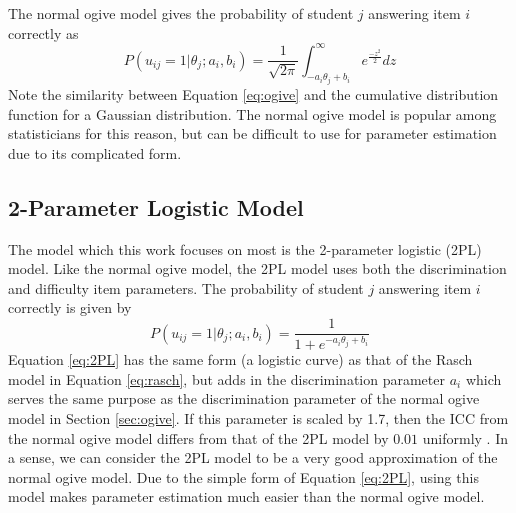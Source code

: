 The normal ogive model gives the probability of student $j$ answering item $i$ correctly as
\begin{equation}
  P(u_{ij} = 1 | \theta_j; a_i, b_i) = \frac{1}{\sqrt{2\pi}} \int_{-a_i \theta_j + b_i}^\infty e^{\frac{-z^{2}}{2}}dz
  \label{eq:ogive}
\end{equation}
Note the similarity between Equation \ref{eq:ogive} and the cumulative distribution function for a Gaussian distribution. The normal ogive model is popular among statisticians for this reason, but can be difficult to use for parameter estimation due to its complicated form.

\subsection{2-Parameter Logistic Model}
The model which this work focuses on most is the 2-parameter logistic (2PL) model. Like the normal ogive model, the 2PL model uses both the discrimination and difficulty item parameters. The probability of student $j$ answering item $i$ correctly is given by
\begin{equation}
  P(u_{ij} = 1 | \theta_j; a_i, b_i) = \frac{1}{1 + e^{-a_i \theta_j + b_i}}
  \label{eq:2PL}
\end{equation}
Equation \ref{eq:2PL} has the same form (a logistic curve) as that of the Rasch model in Equation \ref{eq:rasch}, but adds in the discrimination parameter $a_i$ which serves the same purpose as the discrimination parameter of the normal ogive model in Section \ref{sec:ogive}. If this parameter is scaled by 1.7, then the ICC from the normal ogive model differs from that of the 2PL model by $0.01$ uniformly \cite{baker_kim2004}. In a sense, we can consider the 2PL model to be a very good approximation of the normal ogive model. Due to the simple form of Equation \ref{eq:2PL}, using this model makes parameter estimation much easier than the normal ogive model.

